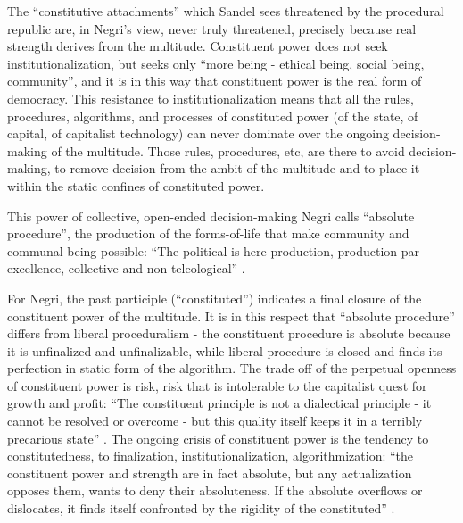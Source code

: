 \documentclass[12pt,oneside]{memoir}
\begin{document}
The ``constitutive attachments'' which Sandel sees threatened by the procedural republic are, in Negri's view, never truly threatened, precisely because real strength derives from the multitude. Constituent power does not seek institutionalization, but seeks only ``more being - ethical being, social being, community'', and it is in this way that constituent power is the real form of democracy. This resistance to institutionalization means that all the rules, procedures, algorithms, and processes of constituted power (of the state, of capital, of capitalist technology) can never dominate over the ongoing decision-making of the multitude. Those rules, procedures, etc, are there to avoid decision-making, to remove decision from the ambit of the multitude and to place it within the static confines of constituted power.
	
This power of collective, open-ended decision-making Negri calls ``absolute procedure'', the production of the forms-of-life that make community and communal being possible: ``The political is here production, production par excellence, collective and non-teleological'' \citep[27]{Negri1999}.
	
For Negri, the past participle (``constituted'') indicates a final closure of the constituent power of the multitude. It is in this respect that ``absolute procedure'' differs from liberal proceduralism - the constituent procedure is absolute because it is unfinalized and unfinalizable, while liberal procedure is closed and finds its perfection in static form of the algorithm. The trade off of the perpetual openness of constituent power is risk, risk that is intolerable to the capitalist quest for growth and profit: ``The constituent principle is not a dialectical principle - it cannot be resolved or overcome - but this quality itself keeps it in a terribly precarious state'' \citep[60]{Negri1999}. The ongoing crisis of constituent power is the tendency to constitutedness, to finalization, institutionalization, algorithmization: ``the constituent power and strength are in fact absolute, but any actualization opposes them, wants to deny their absoluteness. If the absolute overflows or dislocates, it finds itself confronted by the rigidity of the constituted'' \citep[60]{Negri1999}. 
	
\end{document}
